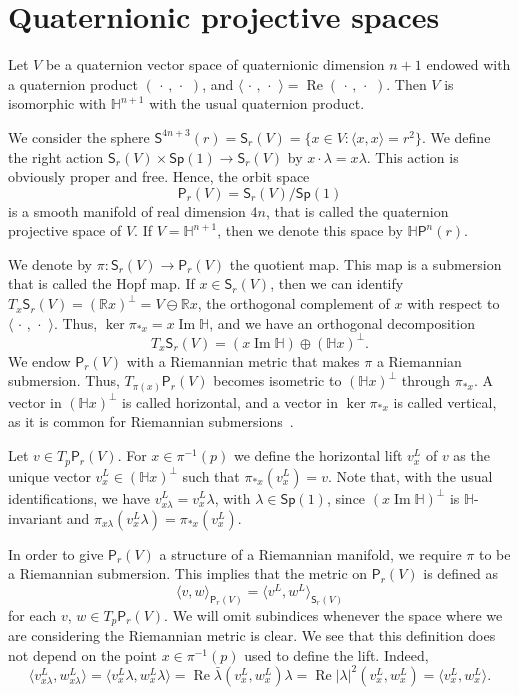 \documentclass[12pt, a4paper,draft]{amsart}
\newcommand{\R}{\mathbb{R}}
\renewcommand{\H}{\mathbb{H}}
\renewcommand{\Re}{\operatorname{Re}}
\renewcommand{\Im}{\operatorname{Im}}
\newcommand{\Sp}{\mathsf{Sp}}
\theoremstyle{remark}
\begin{document}
\section{Quaternionic projective spaces}

Let $V$ be a quaternion vector space of quaternionic dimension $n+1$ endowed with a quaternion product $(\,\cdot\,,\,\cdot\,\,)$, and $\langle\,\cdot\,,\,\cdot\,\,\rangle=\Re(\,\cdot\,,\,\cdot\,\,)$.
Then $V$ is isomorphic with $\H^{n+1}$ with the usual quaternion product.

We consider the sphere $\mathsf{S}^{4n+3}(r)=\mathsf{S}_r(V)=\{{x}\in V:\langle {x},{x}\rangle=r^2\}$.
We define the right action $\mathsf{S}_r(V)\times\Sp(1)\to\mathsf{S}_r(V)$ by ${x}\cdot \lambda={x}\lambda$.
This action is obviously proper and free. 
Hence, the orbit space 
\[
\mathsf{P}_r(V)=\mathsf{S}_r(V)/\Sp(1)
\]
is a smooth manifold of real dimension $4n$, that is called the quaternion projective space of $V$.
If $V=\H^{n+1}$, then we denote this space by $\H \mathsf{P}^n(r)$.

We denote by $\pi\colon\mathsf{S}_r(V)\to\mathsf{P}_r(V)$ the quotient map.
This map is a submersion that is called the Hopf map.
If ${x}\in\mathsf{S}_r(V)$, then we can identify $T_{x}\mathsf{S}_r(V)=(\R{x})^\perp=V\ominus\R{x}$, the orthogonal complement of ${x}$ with respect to $\langle\,\cdot\,,\,\cdot\,\,\rangle$.
Thus, $\ker\pi_{*{x}}={x}\Im\H$, and we have an orthogonal decomposition 
\[
T_{x}\mathsf{S}_r(V)=({x}\Im\H)\oplus(\H{x})^\perp.
\]
We endow $\mathsf{P}_r(V)$ with a Riemannian metric that makes $\pi$ a Riemannian submersion.
Thus, $T_{\pi({x})}\mathsf{P}_r(V)$ becomes isometric to $(\H{x})^\perp$ through $\pi_{*{x}}$.
A vector in $(\H x)^\perp$ is called horizontal, and a vector in $\ker\pi_{*x}$ is called vertical, as it is common for Riemannian submersions~\cite{ONeill}.

Let $v\in T_{p}\mathsf{P}_r(V)$.
For ${x}\in\pi^{-1}(p)$ we define the horizontal lift $v^L_{x}$ of $v$ as the unique vector $v_x^L\in(\H{x})^\perp$ such that $\pi_{*{x}}(v^L_{x})=v$.
Note that, with the usual identifications, we have $v_{x\lambda}^L=v_x^L\lambda$, with $\lambda\in\Sp(1)$, since $(x\Im\H)^\perp$ is $\H$-invariant and $\pi_{x\lambda}(v_x^L\lambda)=\pi_{*x}(v_x^L)$.
\medskip

In order to give $\mathsf{P}_r(V)$ a structure of a Riemannian manifold, we require $\pi$ to be a Riemannian submersion.
This implies that the metric on $\mathsf{P}_r(V)$ is defined as 
\[
\langle v,w\rangle_{\mathsf{P}_r(V)}=\langle v^L,w^L\rangle_{\mathsf{S}_r(V)}
\] 
for each $v$, $w\in T_p\mathsf{P}_r(V)$.
We will omit subindices whenever the space where we are considering the Riemannian metric is clear.
We see that this definition does not depend on the point ${x}\in\pi^{-1}(p)$ used to define the lift.
Indeed,
\[
\langle v^L_{{x}\lambda},w^L_{{x}\lambda}\rangle=
\langle v^L_{{x}}\lambda,w^L_{{x}}\lambda\rangle=
\Re\bar{\lambda}(v^L_{x},w^L_{x})\lambda=
\Re\lvert\lambda\rvert^2(v^L_{x},w^L_{x})=
\langle v^L_{x},w^L_{x}\rangle.
\]
\end{document}
